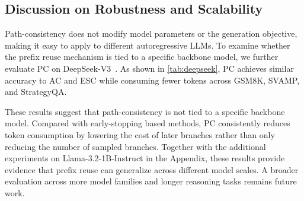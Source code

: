 \subsection{Discussion on Robustness and Scalability}

Path-consistency does not modify model parameters or the generation objective, making it easy to apply to different autoregressive LLMs. 
To examine whether the prefix reuse mechanism is tied to a specific backbone model, we further evaluate PC on DeepSeek-V3~\cite{liu2024deepseek}. 
As shown in \cref{tab:deepseek}, PC achieves similar accuracy to AC and ESC while consuming fewer tokens across GSM8K, SVAMP, and StrategyQA.

\begin{table}[h]
\setlength{\abovecaptionskip}{0.1cm}
\caption{Evaluation results of different efficient self-consistency methods on DeepSeek-V3. The percentages in parentheses denote token increase relative to PC.}
\label{tab:deepseek}
\centering
{}
\end{table}

These results suggest that path-consistency is not tied to a specific backbone model. 
Compared with early-stopping based methods, PC consistently reduces token consumption by lowering the cost of later branches rather than only reducing the number of sampled branches. 
Together with the additional experiments on Llama-3.2-1B-Instruct in the Appendix, these results provide evidence that prefix reuse can generalize across different model scales. 
A broader evaluation across more model families and longer reasoning tasks remains future work.


